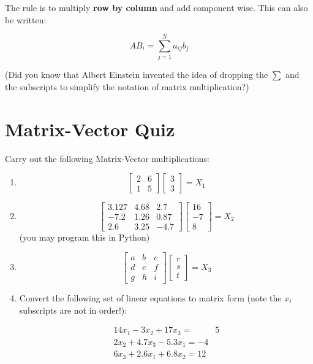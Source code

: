 The rule is to multiply {\bf row by column} and add component wise.   This can also be written:

\[
AB_i = \sum_{j=1}^N  a_{ij}b_j
\]

(Did you know that Albert Einstein invented the idea of dropping the $\sum$ and the subscripts to simplify the notation of matrix multiplication?)


\section{Matrix-Vector Quiz}\label{ComplexNumberReview}

Carry out the following Matrix-Vector multiplications:
\begin{enumerate}
  \item \[
  \begin{bmatrix} 2 & 6 \\ 1 & 5 \end{bmatrix}
  \begin{bmatrix} 3\\3 \end{bmatrix} = X_1
  \]

  \item
  \[
  \begin{bmatrix}
  3.127 & 4.68 & 2.7 \\
  -7.2 & 1.26 & 0.87 \\
  2.6 & 3.25 & -4.7 \end{bmatrix}
  \begin{bmatrix}
  16 \\ -7 \\ 8
  \end{bmatrix}  = X_2
  \]
  (you may program this in Python)


  \item
  \[
  \begin{bmatrix}
  a&b&c \\
  d&e&f \\
  g&h&i \end{bmatrix}
  \begin{bmatrix}
  r\\s\\t
  \end{bmatrix}  = X_3
  \]
  \item  Convert the following set of linear equations to matrix form (note the $x_i$
  subscripts are not in order!):

\[
\begin{aligned}
  14x_1-3x_2+17x_3=&5\\
  2x_2+4.7x_3-5.3x_1=-4\\
  6x_3+2.6x_1+6.8x_2=12
\end{aligned}
\]

\end{enumerate}

